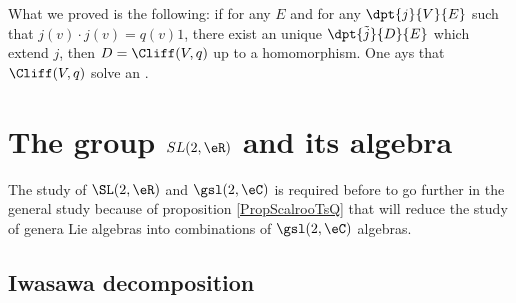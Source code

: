What we proved is the following: if for any $E$ and for any $\dpt{j}{V}{E}$ such that $j(v)\cdot j(v)=q(v)1$, there exist an unique $\dpt{\tilde{j}}{D}{E}$ which extend $j$, then $D=\Cliff(V,q)$ up to a homomorphism. One ays that $\Cliff(V,q)$ solve an .


\section{The group \texorpdfstring{$SL(2,\eR)$}{SL2R} and its algebra}	\label{SecToolSL}

The study of \( \SL(2,\eR)\) and \( \gsl(2,\eC)\) is required before to go further in the general study because of proposition \ref{PropScalrooTsQ} that will reduce the study of genera Lie algebras into combinations of \( \gsl(2,\eC)\) algebras.

\subsection{Iwasawa decomposition}

